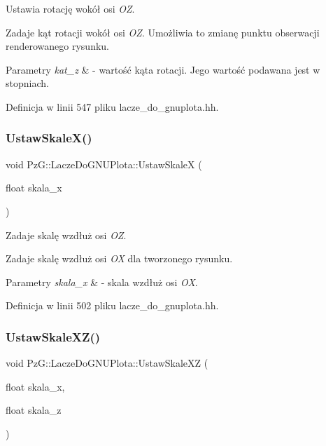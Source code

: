 Ustawia rotację wokół osi {\itshape OZ}. 

Zadaje kąt rotacji wokół osi {\itshape OZ}. Umożliwia to zmianę punktu obserwacji renderowanego rysunku. 
\begin{DoxyParams}{Parametry}
{\em kat\+\_\+z} & -\/ wartość kąta rotacji. Jego wartość podawana jest w stopniach. \\
\hline
\end{DoxyParams}


Definicja w linii 547 pliku lacze\+\_\+do\+\_\+gnuplota.\+hh.

\mbox{\label{class_pz_g_1_1_lacze_do_g_n_u_plota_a855b8338bfe3e5d294d719f24b11090e}} 
\subsubsection{\texorpdfstring{Ustaw\+Skale\+X()}{UstawSkaleX()}}
{\footnotesize\ttfamily void Pz\+G\+::\+Lacze\+Do\+G\+N\+U\+Plota\+::\+Ustaw\+SkaleX (\begin{DoxyParamCaption}\item[{float}]{skala\+\_\+x }\end{DoxyParamCaption})\hspace{0.3cm}{\ttfamily [inline]}}



Zadaje skalę wzdłuż osi {\itshape OZ}. 

Zadaje skalę wzdłuż osi {\itshape OX} dla tworzonego rysunku. 
\begin{DoxyParams}{Parametry}
{\em skala\+\_\+x} & -\/ skala wzdłuż osi {\itshape OX}. \\
\hline
\end{DoxyParams}


Definicja w linii 502 pliku lacze\+\_\+do\+\_\+gnuplota.\+hh.

\mbox{\label{class_pz_g_1_1_lacze_do_g_n_u_plota_a4308151b54e105d302803146a3238699}} 
\subsubsection{\texorpdfstring{Ustaw\+Skale\+X\+Z()}{UstawSkaleXZ()}}
{\footnotesize\ttfamily void Pz\+G\+::\+Lacze\+Do\+G\+N\+U\+Plota\+::\+Ustaw\+Skale\+XZ (\begin{DoxyParamCaption}\item[{float}]{skala\+\_\+x,  }\item[{float}]{skala\+\_\+z }\end{DoxyParamCaption})\hspace{0.3cm}{\ttfamily [inline]}}



